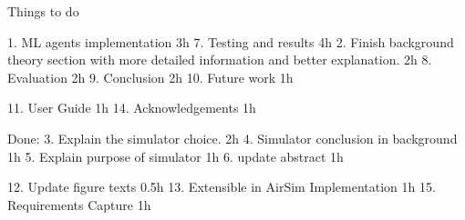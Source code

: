 

Things to do


1. ML agents implementation 3h
7. Testing and results 4h
2. Finish background theory section with more detailed information and better explanation. 2h
8. Evaluation 2h
9. Conclusion 2h 
10. Future work 1h

11. User Guide 1h
14. Acknowledgements 1h






Done:
3. Explain the simulator choice. 2h
4. Simulator conclusion in background 1h
5. Explain purpose of simulator 1h
6. update abstract 1h

12. Update figure texts 0.5h
13. Extensible in AirSim Implementation 1h
15. Requirements Capture 1h

